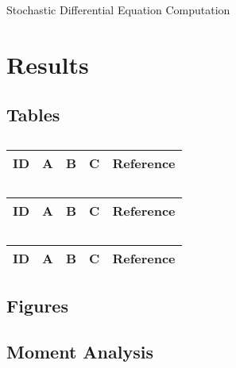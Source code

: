 \begin{algorithm}[H]
\begin{algorithmic}[1]
\end{algorithmic}
\caption{Stochastic Differential Equation Computation}
	\label{Algorithm_2}
\end{algorithm}

\section{Results}

\subsection{Tables}

\centering
\begin{table}[H]\footnotesize
	\caption{}
	\begin{tabular}{rp{1cm}p{2cm}p{3cm}p{1cm}}
		\hline
		ID & A & B & C & Reference \\
		\hline
		\hline
	\end{tabular}
\end{table}
\raggedright

\centering
\begin{table}[H]\footnotesize
	\caption{}
	\begin{tabular}{rp{1cm}p{2cm}p{3cm}p{1cm}}
		\hline
		ID & A & B & C & Reference \\
		\hline
		\hline
	\end{tabular}
\end{table}
\raggedright

\centering
\begin{table}[H]\footnotesize
	\caption{}
	\begin{tabular}{rp{1cm}p{2cm}p{3cm}p{1cm}}
		\hline
		ID & A & B & C & Reference \\
		\hline
		\hline
	\end{tabular}
\end{table}
\raggedright

\subsection{Figures}

\subsection{Moment Analysis}
